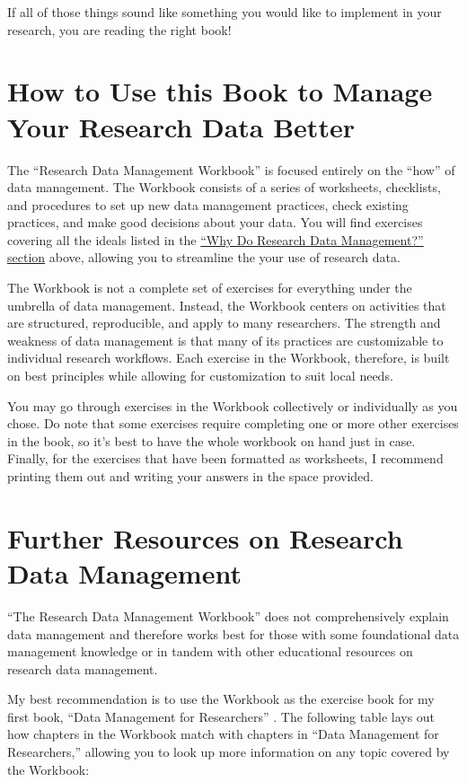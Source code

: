 \documentclass[
]{book}
\begin{document}
If all of those things sound like something you would like to implement in your research, you are reading the right book!

\hypertarget{how-rdm}{%
\section{How to Use this Book to Manage Your Research Data Better}\label{how-rdm}}

The ``Research Data Management Workbook'' is focused entirely on the ``how'' of data management. The Workbook consists of a series of worksheets, checklists, and procedures to set up new data management practices, check existing practices, and make good decisions about your data. You will find exercises covering all the ideals listed in the \protect\hyperlink{why-rdm}{``Why Do Research Data Management?'' section} above, allowing you to streamline the your use of research data.

The Workbook is not a complete set of exercises for everything under the umbrella of data management. Instead, the Workbook centers on activities that are structured, reproducible, and apply to many researchers. The strength and weakness of data management is that many of its practices are customizable to individual research workflows. Each exercise in the Workbook, therefore, is built on best principles while allowing for customization to suit local needs.

You may go through exercises in the Workbook collectively or individually as you chose. Do note that some exercises require completing one or more other exercises in the book, so it's best to have the whole workbook on hand just in case. Finally, for the exercises that have been formatted as worksheets, I recommend printing them out and writing your answers in the space provided.

\hypertarget{more-rdm}{%
\section{Further Resources on Research Data Management}\label{more-rdm}}

``The Research Data Management Workbook'' does not comprehensively explain data management and therefore works best for those with some foundational data management knowledge or in tandem with other educational resources on research data management.

My best recommendation is to use the Workbook as the exercise book for my first book, ``Data Management for Researchers'' \citep{briney_data_2015}. The following table lays out how chapters in the Workbook match with chapters in ``Data Management for Researchers,'' allowing you to look up more information on any topic covered by the Workbook:
\end{document}
